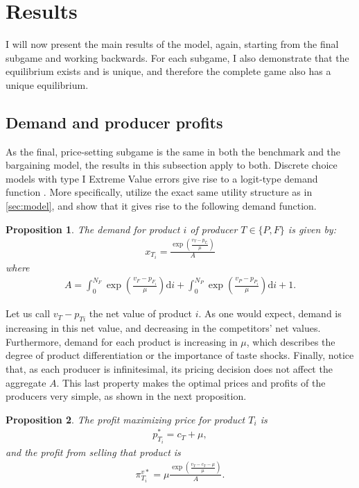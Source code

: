 \documentclass[a4paper]{article}
\newtheorem{proposition}{Proposition}
\newcommand{\di}{\mathrm{d}i}
\begin{document}
\section{Results}
\label{sec:results}

I will now present the main results of the model, again, starting from the final subgame and working backwards.
For each subgame, I also demonstrate that the equilibrium exists and is unique, and therefore the complete game also has a unique equilibrium.

\subsection{Demand and producer profits}

As the final, price-setting subgame is the same in both the benchmark and the bargaining model, the results in this subsection apply to both.
Discrete choice models with type I Extreme Value errors give rise to a logit-type demand function \parencite[e.g.][]{small1981applied}.
More specifically, \textcite[]{anderson2021hybrid} utilize the exact same utility structure as in \cref{sec:model}, and show that it gives rise to the following demand function.
\begin{proposition}
    \label{prop:demand_function}
    The demand for product $i$ of producer $T \in \{P, F\}$ is given by:
    \begin{align*}
        x_{T_i} = \frac{\exp\left( \frac{v_T - p_{T_i}}{\mu} \right)}{A}
    \end{align*}
    where
    \begin{align}
        A = \int_0^{N_F} \exp\left( \frac{v_F - p_{F_i}}{\mu} \right) \di + \int_0^{N_P} \exp\left( \frac{v_P - p_{P_i}}{\mu} \right) \di + 1.
        \label{eq:aggregate}
    \end{align}
\end{proposition}

Let us call $v_T - p_{Ti}$ the net value of product $i$.
As one would expect, demand is increasing in this net value, and decreasing in the competitors' net values.
Furthermore, demand for each product is increasing in $\mu$, which describes the degree of product differentiation or the importance of taste shocks.
Finally, notice that, as each producer is infinitesimal, its pricing decision does not affect the aggregate $A$.
This last property makes the optimal prices and profits of the producers very simple, as shown in the next proposition.
\begin{proposition}
    \label{prop:optimal_profit}
    The profit maximizing price for product $T_i$ is
    \begin{align*}
        p^*_{T_i} = c_T + \mu,
    \end{align*}
    and the profit from selling that product is
    \begin{align}
        \pi^{v*}_{T_i} = \mu \frac{\exp \left( \frac{v_T - c_T - \mu}{\mu} \right)}{A}.
        \label{eq:optimal_profit}
    \end{align}
\end{proposition}
\end{document}
